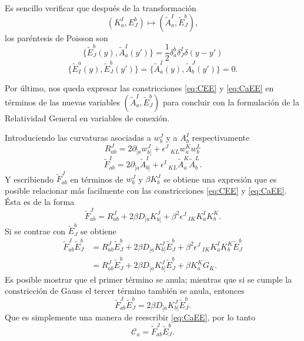 Es sencillo verificar que despu\'{e}s de la transformaci\'{o}n
%
\begin{equation}
(K^{I}_{a}, E^{b}_{J}) \longmapsto (\tilde{A}^{I}_{a}, \tilde{E}^{b}_{J}),
\end{equation}
%
los par\'{e}ntesis de Poisson son
%
\begin{equation}
\label{eq:PoissonEA}
\{\tilde{E}^{b}_{J}(y), \tilde{A}^{I}_{a}(y')\} = \frac{1}{2} \delta^{b}_{a} \delta^{I}_{J} \delta(y-y')
\end{equation}
%
\begin{equation}
\{\tilde{E}^{a}_{I}(y), \tilde{E}^{b}_{J}(y')\} = \{\tilde{A}^{I}_{a}(y), \tilde{A}^{J}_{b}(y')\} = 0.
\end{equation}

Por \'{u}ltimo, nos queda expresar las constricciones \eqref{eq:CEE} y \eqref{eq:CaEE} en t\'{e}rminos de las nuevas variables $(\tilde{A}^{I}_{a}, \tilde{E}^{b}_{J})$ para concluir con la formulaci\'{o}n de la Relatividad General en variables de conexi\'{o}n.

Introduciendo las curvaturas asociadas a $w^{J}_{b}$ y a $A^{I}_{b}$ respectivamente
%
\begin{equation}
R^{J}_{ab} = 2 \partial_{[a} w^{J}_{b]} + \epsilon^{J}\,_{KL} w^{K}_{a} w^{L}_{b}
\end{equation}
%
\begin{equation}
\tilde{F}^{I}_{ab} = 2 \partial_{[a} \tilde{A}^{I}_{b]} + \epsilon^{I}\,_{KL} \tilde{A}^{K}_{a} \tilde{A}^{L}_{b}.
\end{equation}
%
Y escribiendo $\tilde{F}^{J}_{ab}$ en t\'{e}rminos de $w^{J}_{b}$ y $\beta K^{J}_{b}$ se obtiene una expresi\'{o}n que es posible relacionar m\'{a}s facilmente con las constricciones \eqref{eq:CEE} y \eqref{eq:CaEE}. \'{E}sta es de la forma
%
\begin{equation*}
\tilde{F}^{J}_{ab} = R^{J}_{ab} + 2 \beta D_{[a} K^{J}_{b]} + \beta^{2} \epsilon^{J}\,_{IK} K^{I}_{a} K^{K}_{b}.
\end{equation*}
%
Si se contrae con $\tilde{E}^{b}_{J}$ se obtiene
%
\begin{align*}
\tilde{F}^{J}_{ab} \tilde{E}^{b}_{J} & = R^{J}_{ab} \tilde{E}^{b}_{J} + 2 \beta D_{[a} K^{J}_{b]} \tilde{E}^{b}_{J} + \beta^{2} \epsilon^{J}\,_{IK} K^{I}_{a} K^{K}_{b} \tilde{E}^{b}_{J} \\
& = R^{J}_{ab} \tilde{E}^{b}_{J} + 2 \beta D_{[a} K^{J}_{b]} \tilde{E}^{b}_{J} + \beta K^{K}_{a} G_{K}.
\end{align*}
%
Es posible mostrar que el primer t\'{e}rmino se anula; mientras que si se cumple la constricci\'{o}n de Gauss el tercer t\'{e}rmino tambi\'{e}n se anula, entonces
%
\begin{equation*}
\tilde{F}^{J}_{ab} \tilde{E}^{b}_{J} = 2 \beta D_{[a} K^{J}_{b]} \tilde{E}^{b}_{J}.
\end{equation*}
%
Que es simplemente una manera de reescribir \eqref{eq:CaEE}, por lo tanto
%
\begin{equation}
\label{eq:CaEA}
\mathcal{C}_{a} = \tilde{F}^{J}_{ab} \tilde{E}^{b}_{J}.
\end{equation}

